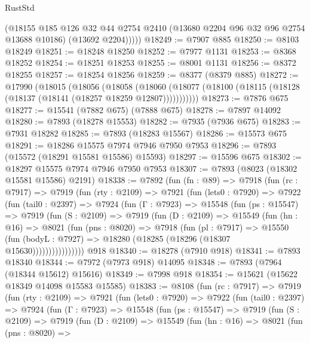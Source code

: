 \begin{lexlean}{RustStd}
\begin{coremodule}
          (@18155
            @185
            @126
            @32
            @44
            @2754
            @2410
            (@13680 @2204 @96 @32 @96 @2754 @13688 @10186)
            (@13692 @2204)))))
@18249 := @7907 @885
@18250 := @8103 @18249
@18251 := @18248 @18250
@18252 := @7977 @1131
@18253 := @8368 @18252
@18254 := @18251 @18253
@18255 := @8001 @1131
@18256 := @8372 @18255
@18257 := @18254 @18256
@18259 := @8377 (@8379 @885)
@18272 := @17990
    (@18015
      (@18056
        (@18058
          (@18060 (@18077 (@18100 (@18115 (@18128 (@18137 (@18141 (@18257 @18259 @12807)))))))))))
@18273 := @7876 @675
@18277 := @15541 (@7882 @675) (@7888 @675)
@18278 := @7897 @14092
@18280 := @7893 (@18278 @15553)
@18282 := @7935 (@7936 @675)
@18283 := @7931 @18282
@18285 := @7893 (@18283 @15567)
@18286 := @15573 @675
@18291 := @18286 @15575 @7974 @7946 @7950 @7953
@18296 := @7893 (@15572 (@18291 @15581 @15586) @15593)
@18297 := @15596 @675
@18302 := @18297 @15575 @7974 @7946 @7950 @7953
@18307 := @7893 (@8023 (@18302 @15581 @15586) @2191)
@18338 := @7892
    (fun (fn : @89) =>
    @7918
      (fun (rc : @7917) =>
      @7919
        (fun (rty : @2109) =>
        @7921
          (fun (lets0 : @7920) =>
          @7922
            (fun (tail0 : @2397) =>
            @7924
              (fun (Γ : @7923) =>
              @15548
                (fun (ps : @15547) =>
                @7919
                  (fun (S : @2109) =>
                  @7919
                    (fun (D : @2109) =>
                    @15549
                      (fun (hn : @16) =>
                      @8021
                        (fun (pns : @8020) =>
                        @7918
                          (fun (pl : @7917) =>
                          @15550
                            (fun (bodyL : @7927) =>
                            @18280 (@18285 (@18296 (@18307 @15630))))))))))))))))
    @918
@18340 := @18278 (@7910 @918)
@18341 := @7893 @18340
@18344 := @7972 (@7973 @918) @14095
@18348 := @7893 (@7964 (@18344 @15612) @15616)
@18349 := @7998 @918
@18354 := @15621 (@15622 @18349 @14098 @15583 @15585)
@18383 := @8108
    (fun (rc : @7917) =>
    @7919
      (fun (rty : @2109) =>
      @7921
        (fun (lets0 : @7920) =>
        @7922
          (fun (tail0 : @2397) =>
          @7924
            (fun (Γ : @7923) =>
            @15548
              (fun (ps : @15547) =>
              @7919
                (fun (S : @2109) =>
                @7919
                  (fun (D : @2109) =>
                  @15549
                    (fun (hn : @16) =>
                    @8021
                      (fun (pns : @8020) =>

\end{coremodule}
\end{lexlean}
